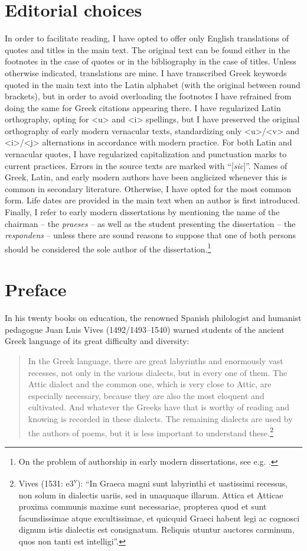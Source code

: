 \section{Editorial choices}
\hypertarget{Toc19704800}{}
In order to facilitate reading, I have opted to offer only English translations of quotes and titles in the main text. The original text can be found either in the footnotes in the case of quotes or in the bibliography in the case of titles. Unless otherwise indicated, translations are mine. I have transcribed Greek keywords quoted in the main text into the Latin alphabet (with the original between round brackets), but in order to avoid overloading the footnotes I have refrained from doing the same for Greek citations appearing there. I have regularized Latin orthography, opting for <u> and <i> spellings, but I have preserved the original orthography of early modern vernacular texts, standardizing only <u>/<v> and <i>/<j> alternations in accordance with modern practice. For both Latin and vernacular quotes, I have regularized capitalization and punctuation marks to current practices. Errors in the source texts are marked with “[\textit{sic}]”. Names of Greek, Latin, and early modern authors have been anglicized whenever this is common in secondary literature. Otherwise, I have opted for the most common form. Life dates are provided in the main text when an author is first introduced. Finally, I refer to early modern dissertations by mentioning the name of the chairman – the \textit{praeses} – as well as the student presenting the dissertation – the \textit{respondens} – unless there are sound reasons to suppose that one of both persons should be considered the sole author of the dissertation.\footnote{On the problem of authorship in early modern dissertations, see e.g. \citet{Considine2008b}.}

\section{Preface}
\hypertarget{Toc19704801}{}
In his twenty books on education, the renowned Spanish philologist and humanist pedagogue Juan Luis Vives (1492/1493–1540) warned students of the ancient Greek language of its great difficulty and diversity:

\begin{quote}
In the Greek language, there are great labyrinths and enormously vast recesses, not only in the various dialects, but in every one of them. The Attic dialect and the common one, which is very close to Attic, are especially necessary, because they are also the most eloquent and cultivated. And whatever the Greeks have that is worthy of reading and knowing is recorded in these dialects. The remaining dialects are used by the authors of poems, but it is less important to understand these.\footnote{Vives (1531: e3\textsuperscript{v}): “In Graeca magni sunt labyrinthi et uastissimi recessus, non solum in dialectis uariis, sed in unaquaque illarum. Attica et Atticae proxima communis maxime sunt necessariae, propterea quod et sunt facundissimae atque excultissimae, et quicquid Graeci habent legi ac cognosci dignum istis dialectis est consignatum. Reliquis utuntur auctores carminum, quos non tanti est intelligi”.}
\end{quote}


